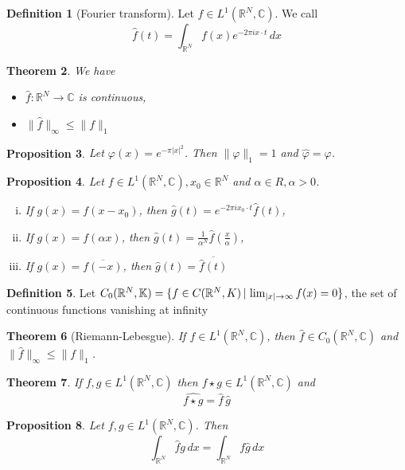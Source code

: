 \documentclass[10pt, oneside, reqno]{amsart}
\theoremstyle{plain}%
\newtheorem{thm}{Theorem}[section]
\newtheorem{prop}[thm]{Proposition}
\theoremstyle{definition}
\newtheorem{defn}[thm]{Definition}
\theoremstyle{remark}
\newcommand{\R}{\mathbb{R}}
\newcommand{\C}{\mathbb{C}}
\renewcommand{\phi}{\varphi}
\begin{document}
\begin{defn}[Fourier transform]
	Let $f \in L^1(\R^N, \C)$.  We call \[
		\hat{f}(t) = \int_{\R^N} f(x) e^{-2 \pi i x \cdot t} \, dx
	\]
\end{defn}

\begin{thm}
	We have 
	\begin{itemize}
		\item $\hat{f} : \R^N \rightarrow \C$ is continuous,
		\item $\|\hat f \|_\infty \leq \|f \|_1$
	\end{itemize}
\end{thm}

\begin{prop}
	Let $\phi(x) = e^{- \pi |x|^2}$.  Then $\|\phi \|_1 = 1$ and $\hat \phi = \phi$.
\end{prop}

\begin{prop}
	Let $f \in L^1(\R^N, \C), x_0 \in \R^N$ and $\alpha \in R, \alpha > 0$. 
	\begin{enumerate}[(i)]
		\item If $g(x) = f(x - x_0)$, then $\hat g (t) = e^{-2 \pi i x_0 \cdot t} \hat f (t)$,
		\item If $g(x) = f(\alpha x)$, then $\hat g (t) = \frac{1}{\alpha^N} \hat f \left( \frac{x}{\alpha}\right)$,
		\item \vspace{0.1cm} If $g(x) = \overline{f(-x)}$, then $\hat g (t) = \overline{\hat f(t)}$
	\end{enumerate}
\end{prop}

\begin{defn}
	Let $C_0(\R^N, \K) = \{ f \in C(\R^N, K) \, | \, \lim_{|x| \rightarrow \infty} f(x) = 0 \}$, the set of continuous functions vanishing at infinity
\end{defn}

\begin{thm}[Riemann-Lebesgue]
	If $f \in L^1(\R^N, \C)$, then $\hat f \in C_0(\R^N, \C)$ and $\| \hat f \|_\infty \leq \|f \|_1$.
\end{thm}

\begin{thm}
	If $f,g \in L^1(\R^N, \C)$ then $f \star g \in L^1(\R^N, \C)$ and \[
		\hat{f \star g} = \hat f \, \hat g
	\]
\end{thm}
\begin{prop}
	Let $f,g \in L^1(\R^N, \C)$.  Then \[
		\int_{\R^N} \hat f g \, dx = \int_{\R^N} f \hat g \, dx
	\]
\end{prop}
\end{document}
